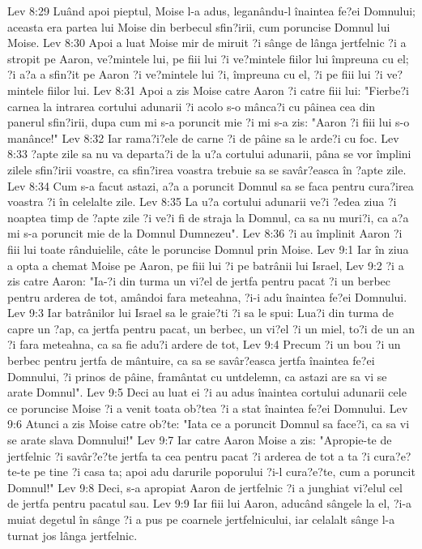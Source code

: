 Lev 8:29  Luând apoi pieptul, Moise l-a adus, leganându-l înaintea fe?ei Domnului; aceasta era partea lui Moise din berbecul sfin?irii, cum poruncise Domnul lui Moise.
Lev 8:30  Apoi a luat Moise mir de miruit ?i sânge de lânga jertfelnic ?i a stropit pe Aaron, ve?mintele lui, pe fiii lui ?i ve?mintele fiilor lui împreuna cu el; ?i a?a a sfin?it pe Aaron ?i ve?mintele lui ?i, împreuna cu el, ?i pe fiii lui ?i ve?mintele fiilor lui.
Lev 8:31  Apoi a zis Moise catre Aaron ?i catre fiii lui: "Fierbe?i carnea la intrarea cortului adunarii ?i acolo s-o mânca?i cu pâinea cea din panerul sfin?irii, dupa cum mi s-a poruncit mie ?i mi s-a zis: "Aaron ?i fiii lui s-o manânce!"
Lev 8:32  Iar rama?i?ele de carne ?i de pâine sa le arde?i cu foc.
Lev 8:33  ?apte zile sa nu va departa?i de la u?a cortului adunarii, pâna se vor împlini zilele sfin?irii voastre, ca sfin?irea voastra trebuie sa se savâr?easca în ?apte zile.
Lev 8:34  Cum s-a facut astazi, a?a a poruncit Domnul sa se faca pentru cura?irea voastra ?i în celelalte zile.
Lev 8:35  La u?a cortului adunarii ve?i ?edea ziua ?i noaptea timp de ?apte zile ?i ve?i fi de straja la Domnul, ca sa nu muri?i, ca a?a mi s-a poruncit mie de la Domnul Dumnezeu".
Lev 8:36  ?i au împlinit Aaron ?i fiii lui toate rânduielile, câte le poruncise Domnul prin Moise.
Lev 9:1  Iar în ziua a opta a chemat Moise pe Aaron, pe fiii lui ?i pe batrânii lui Israel,
Lev 9:2  ?i a zis catre Aaron: "Ia-?i din turma un vi?el de jertfa pentru pacat ?i un berbec pentru arderea de tot, amândoi fara meteahna, ?i-i adu înaintea fe?ei Domnului.
Lev 9:3  Iar batrânilor lui Israel sa le graie?ti ?i sa le spui: Lua?i din turma de capre un ?ap, ca jertfa pentru pacat, un berbec, un vi?el ?i un miel, to?i de un an ?i fara meteahna, ca sa fie adu?i ardere de tot,
Lev 9:4  Precum ?i un bou ?i un berbec pentru jertfa de mântuire, ca sa se savâr?easca jertfa înaintea fe?ei Domnului, ?i prinos de pâine, framântat cu untdelemn, ca astazi are sa vi se arate Domnul".
Lev 9:5  Deci au luat ei ?i au adus înaintea cortului adunarii cele ce poruncise Moise ?i a venit toata ob?tea ?i a stat înaintea fe?ei Domnului.
Lev 9:6  Atunci a zis Moise catre ob?te: "Iata ce a poruncit Domnul sa face?i, ca sa vi se arate slava Domnului!"
Lev 9:7  Iar catre Aaron Moise a zis: "Apropie-te de jertfelnic ?i savâr?e?te jertfa ta cea pentru pacat ?i arderea de tot a ta ?i cura?e?te-te pe tine ?i casa ta; apoi adu darurile poporului ?i-l cura?e?te, cum a poruncit Domnul!"
Lev 9:8  Deci, s-a apropiat Aaron de jertfelnic ?i a junghiat vi?elul cel de jertfa pentru pacatul sau.
Lev 9:9  Iar fiii lui Aaron, aducând sângele la el, ?i-a muiat degetul în sânge ?i a pus pe coarnele jertfelnicului, iar celalalt sânge l-a turnat jos lânga jertfelnic.
